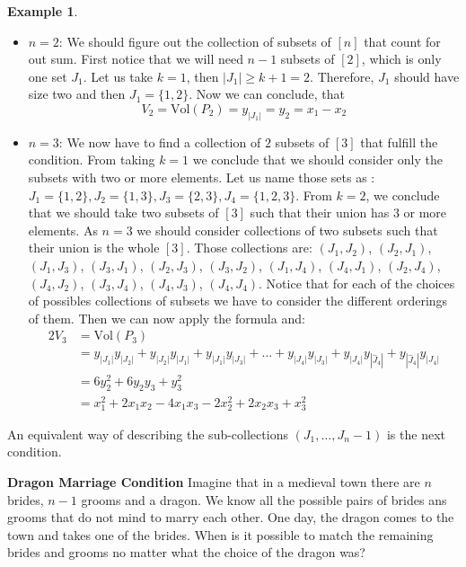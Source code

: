 \documentclass[english,11pt]{article}
\theoremstyle{definition}
\theoremstyle{definition}
\theoremstyle{definition}
\newtheorem{example}{Example}[section]
\theoremstyle{remark}
\theoremstyle{definition}
\begin{document}
\begin{example}
\begin{itemize}
    \item $n=2$: We should figure out the collection of subsets of $[n]$ that count for out sum. First notice that we will need $n-1$ subsets of $[2]$, which is only one set $J_1$. Let us take $k=1$, then $|J_1|\geq k+1= 2$. Therefore, $J_1$ should have size two and then $J_1= \{1,2\}$. Now we can conclude, that
    $$V_2= \text{Vol}(P_2)= y_{|J_1|}=y_2= x_1-x_2$$
    
    \item $n=3$: We now have to find a collection of $2$ subsets of $[3]$ that fulfill the condition. From taking $k=1$ we conclude that we should consider only the subsets with two or more elements. Let us name those sets as : $J_1=\{1,2\}, J_2=\{1,3\}, J_3=\{2,3\}, J_4=\{1,2,3\}$. From $k=2$, we conclude that we should take two subsets of $[3]$ such that their union has 3 or more elements. As $n=3$ we should consider collections of two subsets such that their union is the whole $[3]$. Those collections are: $(J_1, J_2)$, $(J_2, J_1)$, $(J_1, J_3)$, $(J_3, J_1)$, $(J_2, J_3)$, $(J_3, J_2)$, $(J_1, J_4)$, $(J_4, J_1)$, $(J_2, J_4)$, $(J_4, J_2)$, $(J_3, J_4)$, $(J_4, J_3)$, $(J_4, J_4)$. Notice that for each of the choices of possibles collections of subsets we have to consider the different orderings of them. Then we can now apply the formula and:
    \begin{align*}
        2V_3&= \text{Vol}(P_3)\\
        &= y_{|J_1|}y_{|J_2|} + y_{|J_2|}y_{|J_1|}+y_{|J_1|}y_{|J_3|}+ \dots + y_{|J_4|}y_{|J_3|} +y_{|J_4|}y_{|\hat{J}_4|}+ y_{|\hat{J}_4|}y_{|J_4|}\\
        &= 6 y_2^2 + 6y_2y_3 + y_3^2\\
        &= x_1^2+2x_1x_2-4x_1x_3-2x_2^2+2x_2x_3+x_3^2
    \end{align*}

\end{itemize}

\end{example}

An equivalent way of describing the sub-collections $(J_1, \dots, J_n-1)$ is the next condition.

\textbf{Dragon Marriage Condition}
Imagine that in a medieval town there are $n$ brides, $n-1$ grooms and a dragon. We know all the possible pairs of brides ans grooms that do not mind to marry each other. One day, the dragon comes to the town and takes one of the brides. When is it possible to match the remaining brides and grooms no matter what the choice of the dragon was?
\end{document}
